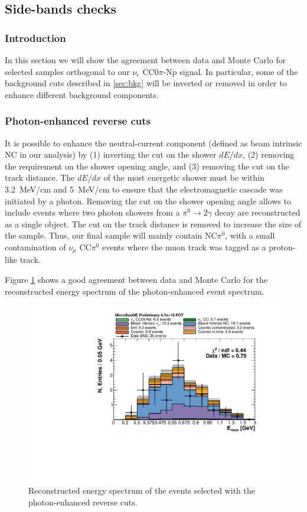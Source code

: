 \subsection{Side-bands checks}
\subsubsection{Introduction}
In this section we will show the agreement between data and Monte Carlo for selected samples orthogonal to our $\nu_{e}$ CC0$\pi$-Np signal. In particular, some of the background cuts described in \ref{sec:bkg} will be inverted or removed in order to enhance different background components.

\subsubsection{Photon-enhanced reverse cuts}
It is possible to enhance the neutral-current component (defined as beam intrinsic NC in our analysis) by (1) inverting the cut on the shower $dE/dx$, (2) removing the requirement on the shower opening angle, and (3) removing the cut on the track distance. The $dE/dx$ of the most energetic shower must be within 3.2~MeV/cm and 5~MeV/cm to ensure that the electromagnetic cascade was initiated by a photon. Removing the cut on the shower opening angle allows to include events where two photon showers from a $\pi^{0}\rightarrow 2\gamma$ decay are reconstructed as a single object. The cut on the track distance is removed to increase the size of the sample.
Thus, our final sample will mainly contain NC$\pi^{0}$, with a small contamination of $\nu_{\mu}$ CC$\pi^{0}$ events where the muon track was tagged as a proton-like track.

Figure \ref{fig:photon} shows a good agreement between data and Monte Carlo for the reconstructed energy spectrum of the photon-enhanced event spectrum.

\begin{figure}[htbp]
\centering
  \includegraphics[width=0.65\linewidth]{figures/nc_reco.pdf}
  \caption{Reconstructed energy spectrum of the events selected with the photon-enhanced reverse cuts.}\label{fig:photon}
\end{figure}

